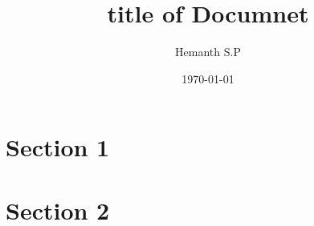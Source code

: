 \documentclass{article}
\begin{document}
\title{title of Documnet}
\author{Hemanth S.P}
\date{\today}
\maketitle
\section{Section 1}
\lipsum[1]
\section{Section 2}
\lipsum[2]
\end{document}
